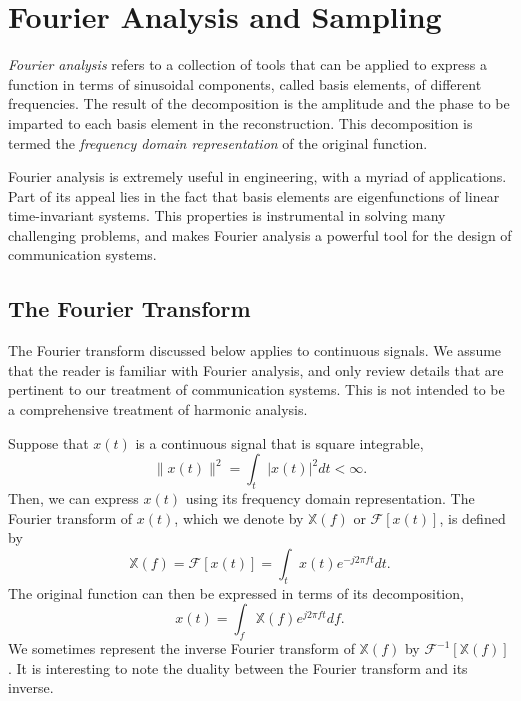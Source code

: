 \chapter{Fourier Analysis and Sampling}
\label{chapter:FourierAnalysisSampling}

\emph{Fourier analysis} refers to a collection of tools that can be applied to express a function in terms of sinusoidal components, called basis elements, of different frequencies.
The result of the decomposition is the amplitude and the phase to be imparted to each basis element in the reconstruction.
This decomposition is termed the \emph{frequency domain representation} of the original function.

Fourier analysis is extremely useful in engineering, with a myriad of applications.
Part of its appeal lies in the fact that basis elements are eigenfunctions of linear time-invariant systems.
This properties is instrumental in solving many challenging problems, and makes Fourier analysis a powerful tool for the design of communication systems.


\section{The Fourier Transform}

The Fourier transform discussed below applies to continuous signals.
We assume that the reader is familiar with Fourier analysis, and only review details that are pertinent to our treatment of communication systems.
This is not intended to be a comprehensive treatment of harmonic analysis.

Suppose that $x(t)$ is a continuous signal that is square integrable,
\begin{equation} \label{equation:L2Condition}
\| x(t) \|^2 = \int_t | x(t) |^2 dt < \infty .
\end{equation}
Then, we can express $x(t)$ using its frequency domain representation.
The Fourier transform of $x(t)$, which we denote by $\mathbb{X}(f)$ or $\mathcal{F} [x(t)]$, is defined by
\begin{equation} \label{equation:FourierTransform}
\mathbb{X}(f) = \mathcal{F} [x(t)]
= \int_t x(t) e^{-j 2 \pi f t} dt .
\end{equation}
The original function can then be expressed in terms of its decomposition,
\begin{equation} \label{equation:InverseFourierTransform}
x(t) = \int_f \mathbb{X}(f) e^{j 2 \pi f t} df .
\end{equation}
We sometimes represent the inverse Fourier transform of $\mathbb{X}(f)$ by $\mathcal{F}^{-1} [\mathbb{X}(f)]$.
It is interesting to note the duality between the Fourier transform and its inverse.

